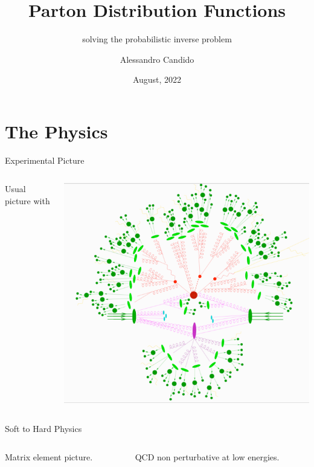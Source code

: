 \documentclass[9pt]{beamer}
\title{Parton Distribution Functions}
\subtitle{solving the probabilistic inverse problem}
\date{August, 2022}
\author{Alessandro Candido}
\begin{document}
\maketitle


\section{The Physics}

\begin{frame}{Experimental Picture}
    \begin{columns}
        \begin{column}{0.5\textwidth}
            Usual picture with 
        \end{column}
        \begin{column}{0.5\textwidth}
            \begin{tcolorbox}
                \includegraphics[width=\textwidth]{proton-to-detector}
            \end{tcolorbox}
        \end{column}
    \end{columns}
\end{frame}

\begin{frame}{Soft to Hard Physics}
    \begin{columns}
        \begin{column}{0.5\textwidth}
            Matrix element picture.
        \end{column}
        \begin{column}{0.5\textwidth}
            QCD non perturbative at low energies.
        \end{column}
    \end{columns}
\end{frame}
\end{document}
